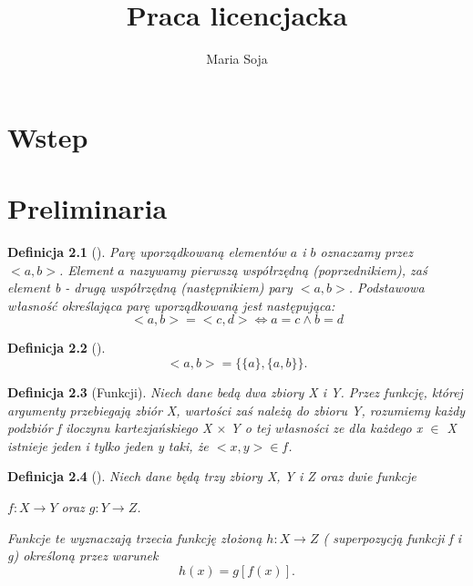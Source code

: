 \documentclass[12pt,a4paper]{report}
\author{Maria Soja}
\title{Praca licencjacka}
\newtheorem{definition}{Definicja}
\begin{document}
\maketitle

\chapter{Wstep}

\chapter{Preliminaria}
\begin{definition}[\citep{kraszewski2007wstkep}]
Parę uporządkowaną elementów $a$ i $b$ oznaczamy przez $<a,b>$. Element $a$ nazywamy pierwszą współrzędną (poprzednikiem), zaś element b - drugą współrzędną (następnikiem) pary $<a,b>$. Podstawowa własność określająca parę uporządkowaną jest następująca:
\begin{equation*}
<a,b>=<c,d>\Leftrightarrow a=c \wedge b=d
\end{equation*} 

\end{definition}
\begin{definition}[\citep{kuratowski1966wstkep}]
\begin{equation*}
<a,b>=\{\{a\},\{a,b\}\}.
\end{equation*}

\end{definition}
\begin{definition}[Funkcji\citep{kuratowski1966wstkep}]
Niech dane bedą dwa zbiory X i Y. Przez funkcję, której argumenty przebiegają zbiór X, wartości zaś należą do zbioru Y, rozumiemy każdy podzbiór f iloczynu kartezjańskiego X $\times$ Y o tej własności ze dla każdego x $\in$ X istnieje jeden i tylko jeden y taki, że $<x,y> \in f$. 

\end{definition}
\begin{definition}[\citep{kuratowski1966wstkep}]
Niech dane będą trzy zbiory X, Y i Z oraz dwie funkcje
\begin{center}
$f:X\to Y$ oraz $g:Y\to Z$.
\end{center}
Funkcje te wyznaczają trzecia funkcję złożoną $h:X\to Z$ ( superpozycją funkcji f i g) określoną przez warunek
\begin{equation*}
h(x)=g[f(x)].
\end{equation*}
\end{definition}
\end{document}
